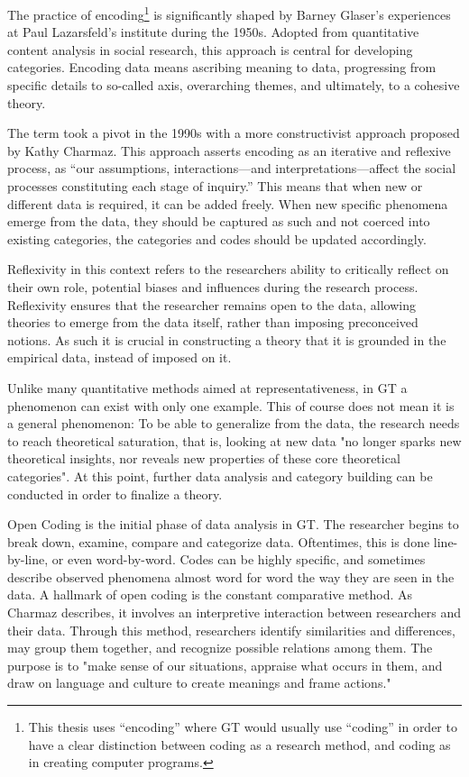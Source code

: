 The practice of encoding\footnote[1]{This thesis uses “encoding” where GT would usually use “coding” in order to have a
clear distinction between coding as a research method, and coding as in creating computer programs.}
is significantly shaped by Barney Glaser's experiences at Paul Lazarsfeld's institute during
the 1950s. Adopted from quantitative content analysis in social research, this approach is central for developing
categories. \cite[p.69-70]{bryant_sage_2019} Encoding data means ascribing meaning to data, progressing from specific details to
so-called axis, overarching themes, and ultimately, to a cohesive theory.

The term took a pivot in the 1990s with a more constructivist approach proposed by Kathy Charmaz. This approach asserts
encoding as an iterative and reflexive process, as “our assumptions, interactions—and interpretations—affect the social
processes constituting each stage of inquiry.” \cite[p.132]{charmaz_constructing_2014} This means that when new or different data is
required, it can be added freely. When new specific phenomena emerge from the data, they should be captured as such and
not coerced into existing categories, the categories and codes should be updated accordingly.

Reflexivity in this context refers to the researchers ability to critically reflect on their own role, potential biases
and influences during the research process. Reflexivity ensures that the researcher remains open to the data, allowing
theories to emerge from the data itself, rather than imposing preconceived notions. As such it is crucial in constructing
a theory that it is grounded in the empirical data, instead of imposed on it.

Unlike many quantitative methods aimed at representativeness, in GT a phenomenon can exist with only one example.
This of course does not mean it is a general phenomenon: To be able to generalize from the data, the research needs to
reach theoretical saturation, that is, looking at new data "no longer sparks new theoretical insights, nor reveals new
properties of these core theoretical categories". \cite[p.113]{charmaz_constructing_2014} At this point, further data analysis and
category building can be conducted in order to finalize a theory.

Open Coding is the initial phase of data analysis in GT. The researcher begins to break down, examine, compare and
categorize data. Oftentimes, this is done line-by-line, or even word-by-word. Codes can be highly specific, and sometimes
describe observed phenomena almost word for word the way they are seen in the data. A hallmark of open coding is the
constant comparative method. As Charmaz describes, it involves an interpretive interaction between researchers and their
data. Through this method, researchers identify similarities and differences, may group them together, and recognize
possible relations among them. The purpose is to "make sense of our situations, appraise what occurs in them, and draw
on language and culture to create meanings and frame actions." \cite[p.179]{charmaz_constructing_2014}

